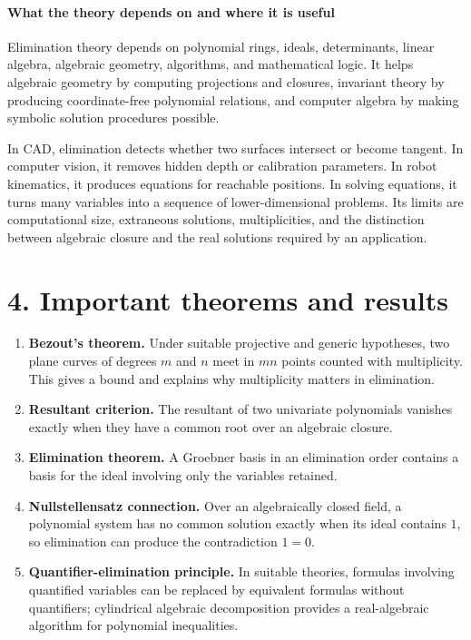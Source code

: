 \paragraph{What the theory depends on and where it is useful}

Elimination theory depends on polynomial rings, ideals, determinants, linear algebra, algebraic geometry, algorithms, and mathematical logic. It helps algebraic geometry by computing projections and closures, invariant theory by producing coordinate-free polynomial relations, and computer algebra by making symbolic solution procedures possible.

In CAD, elimination detects whether two surfaces intersect or become tangent. In computer vision, it removes hidden depth or calibration parameters. In robot kinematics, it produces equations for reachable positions. In solving equations, it turns many variables into a sequence of lower-dimensional problems. Its limits are computational size, extraneous solutions, multiplicities, and the distinction between algebraic closure and the real solutions required by an application.

\section*{4. Important theorems and results}
\begin{enumerate}[leftmargin=*,itemsep=0.35em]

\item \textbf{Bezout's theorem.} Under suitable projective and generic hypotheses, two plane curves of degrees $m$ and $n$ meet in $mn$ points counted with multiplicity. This gives a bound and explains why multiplicity matters in elimination. \cite{elimination_theory_ref2}

\item \textbf{Resultant criterion.} The resultant of two univariate polynomials vanishes exactly when they have a common root over an algebraic closure. \cite{elimination_theory_ref4}

\item \textbf{Elimination theorem.} A Groebner basis in an elimination order contains a basis for the ideal involving only the variables retained. \cite{elimination_theory_ref1}

\item \textbf{Nullstellensatz connection.} Over an algebraically closed field, a polynomial system has no common solution exactly when its ideal contains $1$, so elimination can produce the contradiction $1=0$. \cite{elimination_theory_ref5}

\item \textbf{Quantifier-elimination principle.} In suitable theories, formulas involving quantified variables can be replaced by equivalent formulas without quantifiers; cylindrical algebraic decomposition provides a real-algebraic algorithm for polynomial inequalities. \cite{elimination_theory_ref6}
\end{enumerate}

